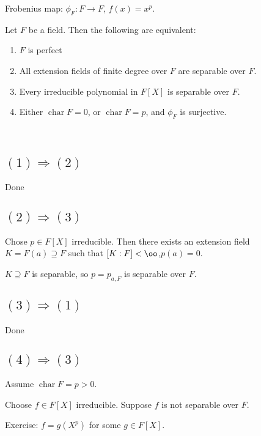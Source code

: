 \documentclass[x11names,reqno,14pt]{extarticle}
\DeclareMathOperator{\Char}{char}
\begin{document}
Frobenius map: $\phi_F:F\to F$, $f(x) = x^p$. 

\thm

Let $F$ be a field. Then the following are equivalent:

\begin{enumerate}

\item $F$ is perfect

\item All extension fields of finite degree over $F$ are separable over $F$. 

\item Every irreducible polynomial in $F[X]$ is separable over $F$. 

\item Either $\Char F = 0$, or $\Char F = p$, and $\phi_F$ is surjective. 

\end{enumerate}

\proof\,

\subsection*{$(1)\Rightarrow(2)$}

Done

\subsection*{$(2)\Rightarrow(3)$}

Chose $p \in F[X]$ irreducible. Then there exists an extension field $K = F(a) \supseteq F$ such that $[K:F]<\oo$,$p(a) =0$. 

$K \supseteq F$ is separable, so $p = p_{a, F}$ is separable over $F$. 

\subsection*{$(3)\Rightarrow(1)$}

Done

\subsection*{$(4)\Rightarrow(3)$}

Assume $\Char F = p > 0$. 

Choose $f \in F[X]$ irreducible. Suppose $f$ is not separable over $F$. 

Exercise: $f = g(X^p)$ for some $g \in F[X]$. 
\end{document}
